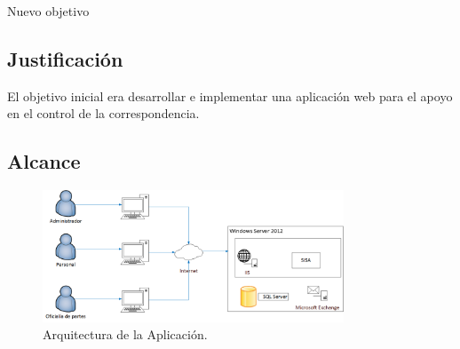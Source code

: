 Nuevo objetivo

\subsection{Justificación}

El objetivo inicial era desarrollar e implementar una aplicación web para el apoyo en el control de la correspondencia.

\subsection{Alcance}

	\begin{figure}[htbp!]
		\centering
			\includegraphics[width=0.8\textwidth]{images/arquitectura}
		\caption{Arquitectura de la Aplicación.}
	\end{figure}
	